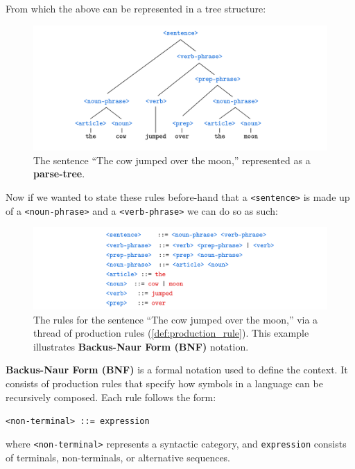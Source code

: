 \noindent
From which the above can be represented in a tree structure:
\begin{figure}[h]
    \centering
    \includegraphics[width=1\textwidth]{Sections/Formal/tree.png}
    \caption{The sentence ``The cow jumped over the moon,'' represented as a \textbf{parse-tree}.}
\end{figure}

\newpage

\noindent
Now if we wanted to state these rules before-hand that a \texttt{<sentence>} is made up of a \texttt{<noun-phrase>} and a \texttt{<verb-phrase>} we can do so as such:

\begin{figure}[h]
    \centering
    \includegraphics[width=1\textwidth]{Sections/Formal/bnf.png}
    \caption{The rules for the sentence ``The cow jumped over the moon,'' via a thread of production rules (\ref{def:production_rule}). This example illustrates \textbf{Backus-Naur Form (BNF)} notation.}
\end{figure}

\vspace{-1em}
\begin{Def}

    \textbf{Backus-Naur Form (BNF)} is a formal notation used to define the context. It consists of production rules that specify how symbols in a language can be recursively composed. Each rule follows the form:
    
    \begin{center}
    \texttt{<non-terminal> ::= expression}
    \end{center}
    
    \noindent
    where \texttt{<non-terminal>} represents a syntactic category, and \texttt{expression} consists of terminals, non-terminals, or alternative sequences.
    
    \end{Def}


